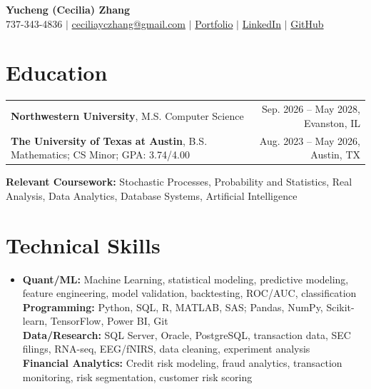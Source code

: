 \documentclass[letterpaper,10pt]{article}
\begin{document}
\begin{center}
{\Large\textbf{Yucheng (Cecilia) Zhang}}\\[-1pt]
\small 737-343-4836 $|$ \href{mailto:ceciliayczhang@gmail.com}{ceciliayczhang@gmail.com} $|$
\href{https://yczhangcc.github.io/yuchengzhang_portfolio/}{Portfolio} $|$
\href{https://www.linkedin.com/in/yczcecilia/}{LinkedIn} $|$
\href{https://github.com/yczhangcc}{GitHub}
\end{center}
\vspace{-8pt}

\section{Education}
{\small
\begin{tabular*}{0.985\textwidth}[t]{l@{\extracolsep{\fill}}r}
\textbf{Northwestern University}, M.S. Computer Science & Sep. 2026 -- May 2028, Evanston, IL \\
\textbf{The University of Texas at Austin}, B.S. Mathematics; CS Minor; GPA: 3.74/4.00 & Aug. 2023 -- May 2026, Austin, TX \\
\end{tabular*}}
\vspace{-2pt}
\footnotesize{\textbf{Relevant Coursework:} Stochastic Processes, Probability and Statistics, Real Analysis, Data Analytics, Database Systems, Artificial Intelligence}
\vspace{-5pt}

\section{Technical Skills}
\begin{itemize}[leftmargin=0.11in,label={},topsep=1pt,itemsep=0pt]
\footnotesize\item{
\textbf{Quant/ML:} Machine Learning, statistical modeling, predictive modeling, feature engineering, model validation, backtesting, ROC/AUC, classification \\
\textbf{Programming:} Python, SQL, R, MATLAB, SAS; Pandas, NumPy, Scikit-learn, TensorFlow, Power BI, Git \\
\textbf{Data/Research:} SQL Server, Oracle, PostgreSQL, transaction data, SEC filings, RNA-seq, EEG/fNIRS, data cleaning, experiment analysis \\
\textbf{Financial Analytics:} Credit risk modeling, fraud analytics, transaction monitoring, risk segmentation, customer risk scoring
}
\end{itemize}
\vspace{-7pt}
\end{document}
